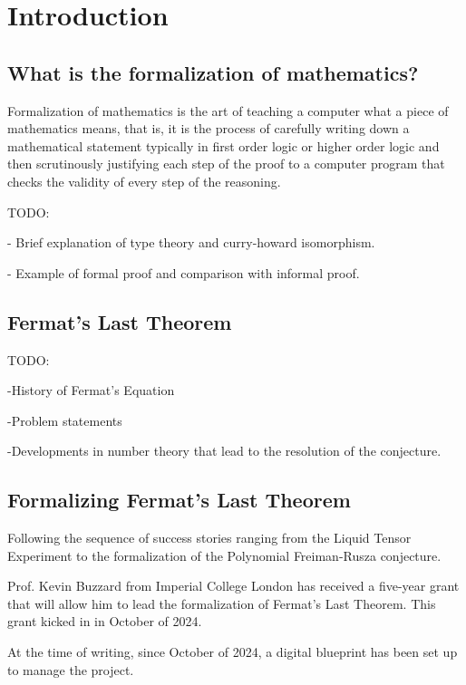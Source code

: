 \chapter{Introduction}\label{Ch1_Introduction}

\section{What is the formalization of mathematics?}

Formalization of mathematics is the art of teaching a computer what a piece of mathematics means, that is, it is the process of carefully writing down a mathematical statement typically in first order logic or higher order logic and then scrutinously justifying each step of the proof to a computer program that checks the validity of every step of the reasoning. 

TODO:

- Brief explanation of type theory and curry-howard isomorphism.

- Example of formal proof and comparison with informal proof.




\section{Fermat's Last Theorem}

TODO:

-History of Fermat's Equation

-Problem statements

-Developments in number theory that lead to the resolution of the conjecture.


\section{Formalizing Fermat's Last Theorem}

Following the sequence of success stories ranging from the Liquid Tensor Experiment to the formalization of the Polynomial Freiman-Rusza conjecture. 

Prof. Kevin Buzzard from Imperial College London has received a five-year grant that will allow him to lead the formalization of Fermat's Last Theorem. This grant kicked in in October of 2024. 

At the time of writing, since October of 2024, a digital blueprint has been set up to manage the project.

